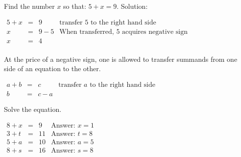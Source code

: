 \begin{frame}
\vskip -0.1cm
\begin{example}
Find the number $x$ so that: $
5+x=9
$. Solution:

\hfil\hfil$
\begin{array}{rcl|l}
5+x &=& 9 &\text{transfer } 5 \text{ to the right hand side}\\
x&=&9-5&\text{When transferred, }5\text{ acquires negative sign}\\
x&=&4\\
\end{array}
$
\end{example}

\vskip -0.1cm
\begin{observation}
At the price of a negative sign, one is allowed to transfer summands from one side of an equation to the other.

\hfil\hfil $
\begin{array}{rcl|l}
a+b &=& c &\text{transfer } a \text{ to the right hand side}\\
b&=&c-a
\end{array}
$
\end{observation}

\vskip -0.1cm
\begin{example}
Solve the equation.

$
\begin{array}{rcll}
8+x&=&9&\text{Answer: }x=1\\
3+t&=&11&\text{Answer: }t=8\\
5+a&=&10&\text{Answer: }a=5\\
8+s&=&16&\text{Answer: }s=8
\end{array}
$

\end{example}

\end{frame}
